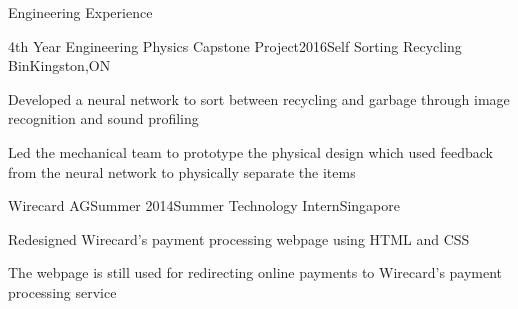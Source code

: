 \documentclass{resume2} %
\begin{document}

\begin{rSection}{Engineering Experience}
	
	\begin{rSubsection}{4th Year Engineering Physics Capstone Project}{2016}{Self Sorting Recycling Bin}{Kingston,ON}
		\item Developed a neural network to sort between recycling and garbage through image recognition and sound profiling
		\item Led the mechanical team to prototype the physical design which used feedback from the neural network to physically separate the items 
	\end{rSubsection}
\iffalse
	\begin{rSubsection}{Engineering Physics Design Project}{2015}{Photodiode Research Sensor}{}
		\item Designed and fabricated a research sensor used to assess the properties of photodiodes. Information gathered included efficiency, current and voltage under illuminated and darkened conditions using an Arduino, Matlab and LabVIEW
	\end{rSubsection}

	\begin{rSubsection}{Engineering Design and Practice II}{2014}{Nuclear Waste Gamma Radiation Detector}{Kingston,ON}
		\item Prototyped a Nuclear Waste Gamma Radiation Detector. Through the process of material selection and decision making, the final product was designed for use in areas surrounding the Deep Geologic Repository in Ontario
	\end{rSubsection}
\fi
	\begin{rSubsection}{Wirecard AG}{Summer 2014}{Summer Technology Intern}{Singapore}
	\item Redesigned Wirecard's payment processing webpage using HTML and CSS
	\item The webpage is still used for redirecting online payments to Wirecard's payment processing service	
	\\
	\end{rSubsection}

\end{rSection}
\end{document}
